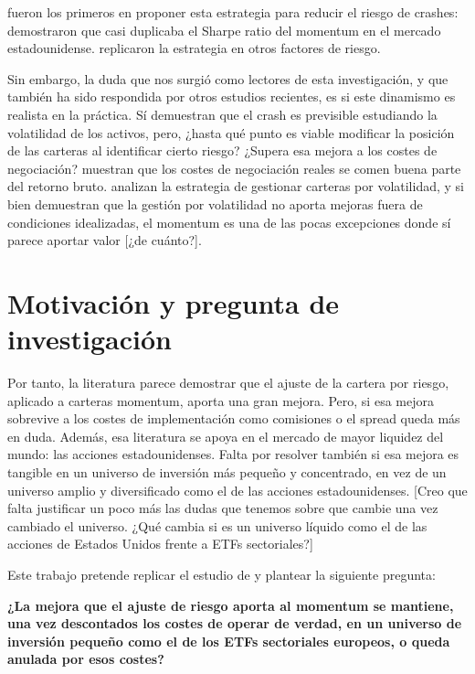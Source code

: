 \documentclass[12pt]{report} %
\begin{document}
\citet{barroso2015} fueron los primeros en proponer esta estrategia para reducir el riesgo de crashes: demostraron que casi duplicaba el Sharpe ratio del momentum en el mercado estadounidense. \citet{moreiramuir2017} replicaron la estrategia en otros factores de riesgo.

Sin embargo, la duda que nos surgió como lectores de esta investigación, y que también ha sido respondida por otros estudios recientes, es si este dinamismo es realista en la práctica. Sí demuestran que el crash es previsible estudiando la volatilidad de los activos, pero, ¿hasta qué punto es viable modificar la posición de las carteras al identificar cierto riesgo? ¿Supera esa mejora a los costes de negociación? \citet{frazzini2018} muestran que los costes de negociación reales se comen buena parte del retorno bruto. \citet{cederburg2020} analizan la estrategia de gestionar carteras por volatilidad, y si bien demuestran que la gestión por volatilidad no aporta mejoras fuera de condiciones idealizadas, el momentum es una de las pocas excepciones donde sí parece aportar valor [¿de cuánto?].

\section{Motivación y pregunta de investigación}

Por tanto, la literatura parece demostrar que el ajuste de la cartera por riesgo, aplicado a carteras momentum, aporta una gran mejora. Pero, si esa mejora sobrevive a los costes de implementación como comisiones o el spread queda más en duda. Además, esa literatura se apoya en el mercado de mayor liquidez del mundo: las acciones estadounidenses. Falta por resolver también si esa mejora es tangible en un universo de inversión más pequeño y concentrado, en vez de un universo amplio y diversificado como el de las acciones estadounidenses. [Creo que falta justificar un poco más las dudas que tenemos sobre que cambie una vez cambiado el universo. ¿Qué cambia si es un universo líquido como el de las acciones de Estados Unidos frente a ETFs sectoriales?]

Este trabajo pretende replicar el estudio de \citet{barroso2015} y plantear la siguiente pregunta:

\textbf{¿La mejora que el ajuste de riesgo aporta al momentum se mantiene, una vez descontados los costes de operar de verdad, en un universo de inversión pequeño como el de los ETFs sectoriales europeos, o queda anulada por esos costes?}
\end{document}
